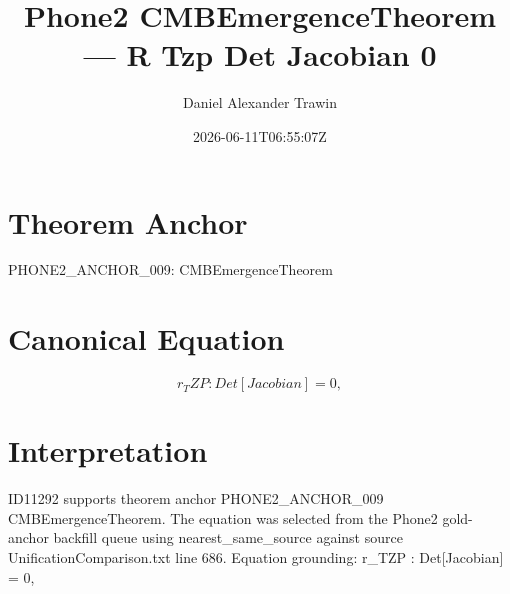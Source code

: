 \documentclass[11pt]{article}
\title{Phone2 CMBEmergenceTheorem — R Tzp Det Jacobian 0}
\author{Daniel Alexander Trawin}
\date{2026-06-11T06:55:07Z}
\begin{document}
\maketitle
\section*{Theorem Anchor}
PHONE2_ANCHOR_009: CMBEmergenceTheorem
\section*{Canonical Equation}
\[
r_TZP : Det[Jacobian] = 0,
\]
\section*{Interpretation}
ID11292 supports theorem anchor PHONE2_ANCHOR_009 CMBEmergenceTheorem. The equation was selected from the Phone2 gold-anchor backfill queue using nearest_same_source against source UnificationComparison.txt line 686. Equation grounding: r_TZP : Det[Jacobian] = 0,
\end{document}
